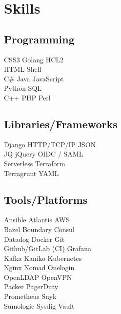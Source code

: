 \documentclass[]{cv}
\begin{document}
\begin{minipage}[t]{0.25\textwidth}

\section{Skills}\label{sec:skills}
\subsection{Programming}\label{subsec:programming}
\sectionsep
{}
CSS3
\textbullet{} Golang
\textbullet{} HCL2 \\
HTML
\textbullet{} Shell \\
\sectionsep
{}
C\#
\textbullet{} Java
\textbullet{} JavaScript \\
Python
\textbullet{}  SQL \\
\sectionsep
{}
C++
\textbullet{} PHP
\textbullet{} Perl
\sectionsep
\sectionsep
\subsection{Libraries/Frameworks}\label{subsec:libraries/frameworks}
\sectionsep
Django
\textbullet{} HTTP/TCP/IP
\textbullet{} JSON \\
JQ
\textbullet{} jQuery
\textbullet{} OIDC / SAML \\
Serverless
\textbullet{} Terraform \\
Terragrunt
\textbullet{} YAML
\sectionsep
\sectionsep
\subsection{Tools/Platforms}\label{subsec:tools/platforms}
\sectionsep
Ansible
\textbullet{} Atlantis
\textbullet{} AWS \\
Bazel
\textbullet{} Boundary
\textbullet{} Consul \\
Datadog
\textbullet{} Docker
\textbullet{} Git \\
Github/GitLab (CI)
\textbullet{} Grafana \\
Kafka
\textbullet{} Kaniko
\textbullet{} Kubernetes \\
Nginx
\textbullet{} Nomad
\textbullet{} Onelogin \\
OpenLDAP
\textbullet{} OpenVPN \\
Packer
\textbullet{} PagerDuty \\
Prometheus
\textbullet{} Snyk \\
Sumologic
\textbullet{} Sysdig
\textbullet{} Vault
\sectionsep

\end{minipage}
\end{document}
